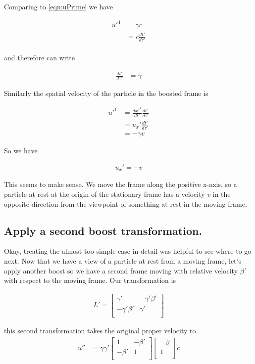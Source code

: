 \documentclass{article}
\begin{document}
Comparing to \ref{eqn:uPrime} we have

\begin{align*}
{u'}^4 
&= \gamma c \\
&= c \frac{{dt'}}{d\tau'} \\
\end{align*}

and therefore can write

\begin{align*}
\frac{{dt'}}{d\tau'} 
&= \gamma 
\end{align*}

Similarly the spatial velocity of the particle in the boosted frame is

\begin{align*}
{u'}^1
&=
\frac{{dx'}^1}{dt'} \frac{{dt'}}{d\tau'} \\
&= u_x' \frac{{dt'}}{d\tau'} \\
&= - \gamma v
\end{align*}

So we have 

\begin{align*}
u_x' = -v 
\end{align*}

This seems to make sense.  We move the frame along the positive x-axis, so a particle at rest at the origin of the stationary frame has a velocity $v$ in the opposite direction from the viewpoint of something at rest in the moving frame.

\subsection{ Apply a second boost transformation. }

Okay, treating the almost too simple case in detail was helpful to see where to go next.  Now that we have a view of a particle at rest
from a moving frame, let's apply another boost so we have a second frame moving with relative velocity $\beta'$ with respect to the moving
frame.  Our transformation is

\begin{align*}
L' =
\begin{bmatrix}
\gamma' & - \gamma' \beta' \\
- \gamma' \beta' & \gamma' \\
\end{bmatrix}
\end{align*}

this second transformation takes the original proper velocity to
\begin{align*}
u'' &=
\gamma \gamma'
\begin{bmatrix}
1 & - \beta' \\
- \beta' & 1 \\
\end{bmatrix}
\begin{bmatrix}
- \beta \\
1 \\
\end{bmatrix}
c \\
\end{align*}
\end{document}
